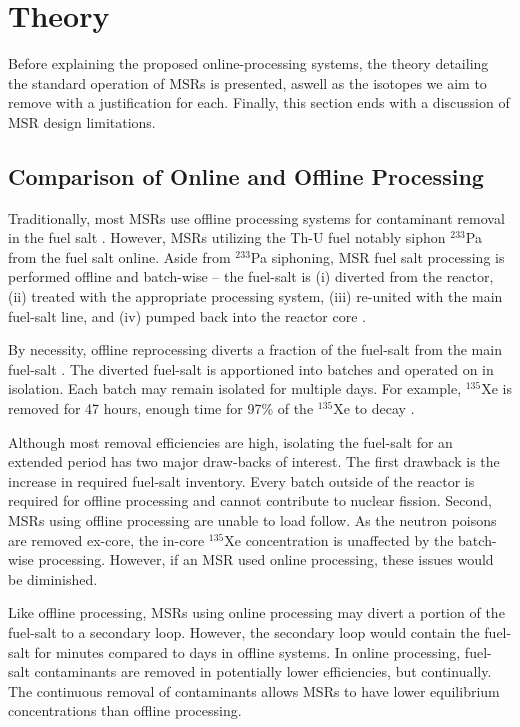 \documentclass{anstrans}
\begin{document}
\section{Theory}
Before explaining the proposed online-processing systems, the theory detailing the standard operation of MSRs is presented, aswell as the isotopes we aim to remove with a justification for each. Finally, this section ends with a discussion of MSR design limitations.

\subsection{Comparison of Online and Offline Processing}
Traditionally, most MSRs use offline processing systems for contaminant removal in the fuel salt \cite{msbrreprocessing}. However, MSRs utilizing the Th-U fuel notably siphon $^{233}$Pa from the fuel salt online. Aside from $^{233}$Pa siphoning, MSR fuel salt processing is performed offline and batch-wise -- the fuel-salt is (i) diverted from the reactor, (ii) treated with the appropriate processing system, (iii) re-united with the main fuel-salt line, and (iv) pumped back into the reactor core \cite{msbrreprocessing}.

By necessity, offline reprocessing diverts a fraction of the fuel-salt from the main fuel-salt \cite{XeRemoval}. The diverted fuel-salt is apportioned into batches and operated on in isolation. Each batch may remain isolated for multiple days. For example, $^{135}$Xe is removed for 47 hours, enough time for 97\% of the $^{135}$Xe to decay \cite{diversion}.

Although most removal efficiencies are high, isolating the fuel-salt for an extended period has two major draw-backs of interest. The first drawback is the increase in required fuel-salt inventory. Every batch outside of the reactor is required for offline processing and cannot contribute to nuclear fission. Second, MSRs using offline processing are unable to load follow. As the neutron poisons are removed ex-core, the in-core $^{135}$Xe concentration is unaffected by the batch-wise processing. However, if an MSR used online processing, these issues would be diminished.

Like offline processing, MSRs using online processing may divert a portion of the fuel-salt to a secondary loop. However, the secondary loop would contain the fuel-salt for minutes compared to days in offline systems. In online processing, fuel-salt contaminants are removed in potentially lower efficiencies, but continually. The continuous removal of contaminants allows MSRs to have lower equilibrium concentrations than offline processing.
\end{document}

